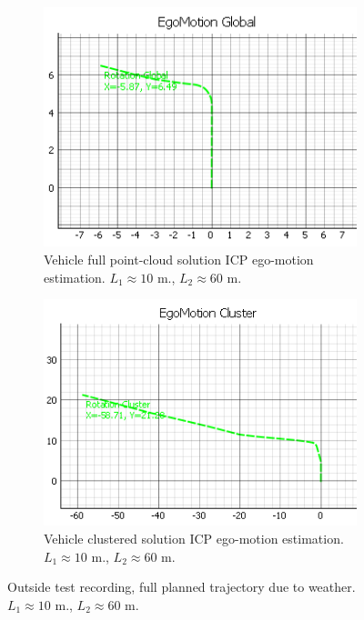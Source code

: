 \begin{figure}[!htbp]
    \centering
    \begin{subfigure}{0.48\linewidth}
        \centering
        \includegraphics[width=\linewidth]{images/ICPOutside_Full7.png}
        \caption{Vehicle full point-cloud solution ICP ego-motion estimation. $L_1 \approx 10$ m., $L_2 \approx 60$ m. }
        \label{fig:odometryFull7}
    \end{subfigure}
    \hfill
    \begin{subfigure}{0.48\linewidth}
        \centering
        \includegraphics[width=\linewidth]{images/ICPOutside_Cluster7.png}
        \caption{Vehicle clustered solution ICP ego-motion estimation. $L_1 \approx 10$ m., $L_2 \approx 60$ m. }
        \label{fig:odometryCluster7}
    \end{subfigure}
    \caption{Outside test recording, full planned trajectory due to weather. $L_1 \approx 10$ m., $L_2 \approx 60$ m. }
    \label{fig:outsideOdometry7}
\end{figure}

